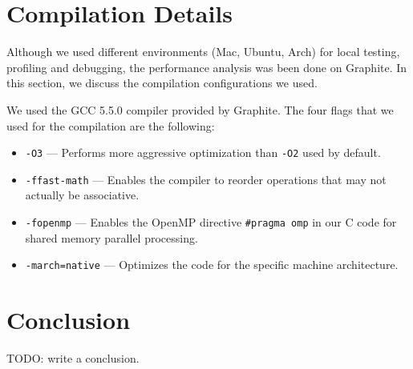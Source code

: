 \documentclass{article}
\begin{document}
\section{Compilation Details}

Although we used different environments (Mac, Ubuntu, Arch) for local testing, profiling and debugging, 
the performance analysis was been done on Graphite. In this section, we discuss the compilation configurations we used.

We used the GCC 5.5.0 compiler provided by Graphite. The four flags that we used for the compilation are the following:
\begin{itemize}
	\item \texttt{-O3} --- Performs more aggressive optimization than \texttt{-O2} used by default.
	\item \texttt{-ffast-math} --- Enables the compiler to reorder operations that may not actually be associative.
	\item \texttt{-fopenmp} --- Enables the OpenMP directive \texttt{\#pragma omp} in our C code for shared memory parallel processing.
	\item \texttt{-march=native} --- Optimizes the code for the specific machine architecture.
\end{itemize}

\section{Conclusion}

TODO: write a conclusion.
\end{document}
